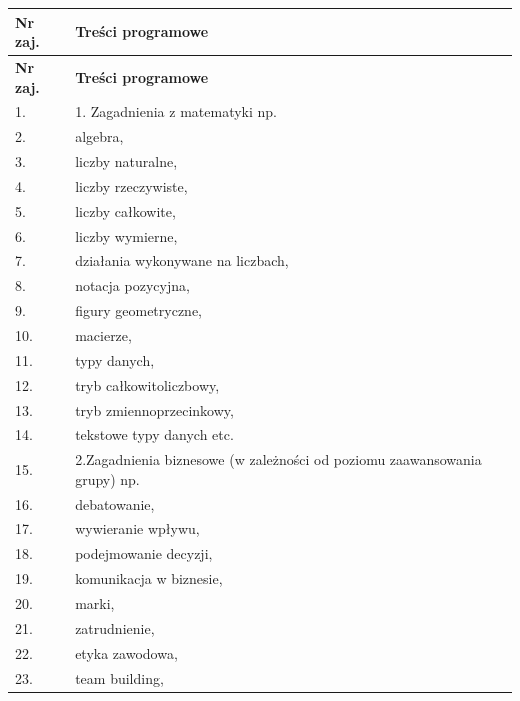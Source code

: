 \documentclass[12pt, a4paper]{article}
\newcommand{\thdrule}{\noalign{\global\setlength{\extrarowheight}{0pt}}}
\newcommand{\thdend}{\noalign{\global\setlength{\extrarowheight}{3pt}}}
\begin{document}
{\scriptsize
\begin{longtable}{m{1.5cm}m{14.5cm}}
\thdrule\toprule
\rowcolor{pjatkRed} {\color{white}\textbf{Nr zaj.}} & {\color{white}\textbf{Treści programowe}} \\
\midrule\thdend
\endfirsthead
\thdrule\toprule
\rowcolor{pjatkRed} {\color{white}\textbf{Nr zaj.}} & {\color{white}\textbf{Treści programowe}} \\
\midrule\thdend
\endhead
  \rowcolor{tableRowLight} 1. & 1. Zagadnienia z matematyki np. \\
  \rowcolor{tableRowAlt} 2. & algebra, \\
  \rowcolor{tableRowLight} 3. & liczby naturalne, \\
  \rowcolor{tableRowAlt} 4. & liczby rzeczywiste, \\
  \rowcolor{tableRowLight} 5. & liczby całkowite, \\
  \rowcolor{tableRowAlt} 6. & liczby wymierne, \\
  \rowcolor{tableRowLight} 7. & działania wykonywane na liczbach, \\
  \rowcolor{tableRowAlt} 8. & notacja pozycyjna, \\
  \rowcolor{tableRowLight} 9. & figury geometryczne, \\
  \rowcolor{tableRowAlt} 10. & macierze, \\
  \rowcolor{tableRowLight} 11. & typy danych, \\
  \rowcolor{tableRowAlt} 12. & tryb całkowitoliczbowy, \\
  \rowcolor{tableRowLight} 13. & tryb zmiennoprzecinkowy, \\
  \rowcolor{tableRowAlt} 14. & tekstowe typy danych etc. \\
  \rowcolor{tableRowLight} 15. & 2.Zagadnienia biznesowe (w zależności od poziomu zaawansowania grupy) np. \\
  \rowcolor{tableRowAlt} 16. & debatowanie, \\
  \rowcolor{tableRowLight} 17. & wywieranie wpływu, \\
  \rowcolor{tableRowAlt} 18. & podejmowanie decyzji, \\
  \rowcolor{tableRowLight} 19. & komunikacja w biznesie, \\
  \rowcolor{tableRowAlt} 20. & marki, \\
  \rowcolor{tableRowLight} 21. & zatrudnienie, \\
  \rowcolor{tableRowAlt} 22. & etyka zawodowa, \\
  \rowcolor{tableRowLight} 23. & team building, \\

\end{longtable}}
\end{document}
